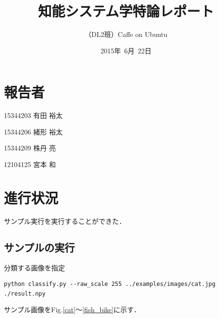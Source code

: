 \documentclass[a4paper,10pt]{jsarticle}
\title{知能システム学特論レポート}
\author{
（DL2班）Caffe on Ubuntu\\
}
\date{2015年\ 6月\ 22日}
\begin{document}
\section{報告者}
\begin{list}{}{}
 \item 15344203\hspace{0.5cm} 有田 裕太
 \item 15344206\hspace{0.5cm} 緒形 裕太
 \item 15344209\hspace{0.5cm} 株丹 亮
 \item 12104125\hspace{0.5cm} 宮本 和
\end{list}

\section{進行状況}
サンプル実行を実行することができた．

\subsection{サンプルの実行}

分類する画像を指定
\begin{lstlisting}[basicstyle=\ttfamily\footnotesize, frame=single]
python classify.py --raw_scale 255 ../examples/images/cat.jpg ./result.npy
\end{lstlisting}

サンプル画像をFig.\ref{cat}〜\ref{fish_bike}に示す．
\end{document}
